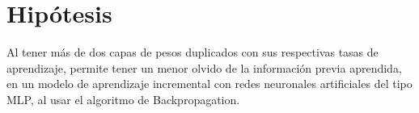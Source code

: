 \section{Hipótesis}
    Al tener m\'as de dos capas de pesos duplicados con sus respectivas tasas de aprendizaje, permite tener un menor olvido de la información previa aprendida, en un modelo de aprendizaje incremental con redes neuronales artificiales del tipo MLP, al usar el algoritmo de Backpropagation.  
